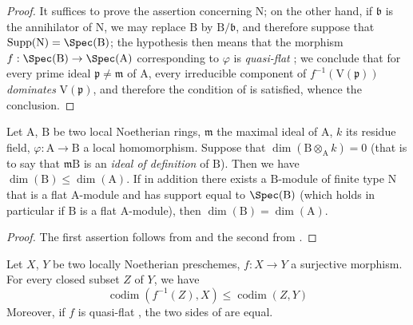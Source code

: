 \begin{proof}
It suffices to prove the assertion concerning $\mathrm{N}$; on the other hand, if $\mathfrak{b}$ is the annihilator of $\mathrm{N}$, we may replace $\mathrm{B}$ by $\mathrm{B}/\mathfrak{b}$, and therefore suppose that $\operatorname{Supp}(\mathrm{N})=\Spec(\mathrm{B})$; the hypothesis then means that the morphism $f:\Spec(\mathrm{B})\to\Spec(\mathrm{A})$ corresponding to $\varphi$ is \emph{quasi-flat} ; we conclude  that for every prime ideal $\mathfrak{p}\neq\mathfrak{m}$ of $\mathrm{A}$,
every irreducible component of $f^{-1}(\mathrm{V}(\mathfrak{p}))$ \emph{dominates} $\mathrm{V}(\mathfrak{p})$, and therefore the condition of  is satisfied, whence the conclusion.
\end{proof}

\begin{corollary}[6.1.3]
\label{IV.6.1.3}
Let $\mathrm{A}$, $\mathrm{B}$ be two local Noetherian rings, $\mathfrak{m}$ the maximal ideal of $\mathrm{A}$, $k$ its residue field, $\varphi:\mathrm{A}\to\mathrm{B}$ a local homomorphism.
Suppose that $\dim(\mathrm{B}\otimes_\mathrm{A} k)=0$ (that is to say  that $\mathfrak{m}\mathrm{B}$ is an \emph{ideal of definition} of $\mathrm{B}$).
Then we have $\dim(\mathrm{B})\leqslant\dim(\mathrm{A})$.
If in addition there exists a $\mathrm{B}$-module of finite type $\mathrm{N}$ that is a flat $\mathrm{A}$-module and has support equal to $\Spec(\mathrm{B})$ (which holds in particular if $\mathrm{B}$ is a flat $\mathrm{A}$-module), then $\dim(\mathrm{B})=\dim(\mathrm{A})$.
\end{corollary}

\begin{proof}
The first assertion follows from  and the second from .
\end{proof}

\begin{corollary}[6.1.4]
\label{IV.6.1.4}
Let $X$, $Y$ be two locally Noetherian preschemes, $f:X\to Y$ a surjective morphism.
For every closed subset $Z$ of $Y$, we have
\begin{equation}
  \operatorname{codim}(f^{-1}(Z),X)\leqslant\operatorname{codim}(Z,Y)
  \label{IV.6.1.4.1}
\tag{6.1.4.1}
\end{equation}
Moreover, if $f$ is quasi-flat , the two sides of  are equal.
\end{corollary}

